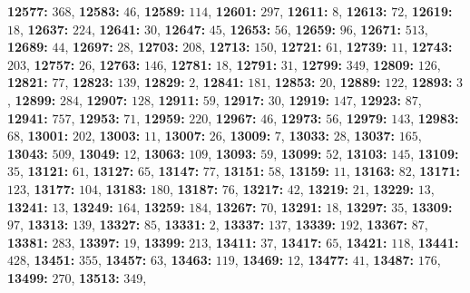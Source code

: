 \textsf{\bfseries 12577:} $368$, \textsf{\bfseries 12583:} $46$, \textsf{\bfseries 12589:} $114$, \textsf{\bfseries 12601:} $297$, \textsf{\bfseries 12611:} $8$, \textsf{\bfseries 12613:} $72$, \textsf{\bfseries 12619:} $18$, \textsf{\bfseries 12637:} $224$, \textsf{\bfseries 12641:} $30$, \textsf{\bfseries 12647:} $45$, \textsf{\bfseries 12653:} $56$, \textsf{\bfseries 12659:} $96$, \textsf{\bfseries 12671:} $513$, \textsf{\bfseries 12689:} $44$, \textsf{\bfseries 12697:} $28$, \textsf{\bfseries 12703:} $208$, \textsf{\bfseries 12713:} $150$, \textsf{\bfseries 12721:} $61$, \textsf{\bfseries 12739:} $11$, \textsf{\bfseries 12743:} $203$, \textsf{\bfseries 12757:} $26$, \textsf{\bfseries 12763:} $146$, \textsf{\bfseries 12781:} $18$, \textsf{\bfseries 12791:} $31$, \textsf{\bfseries 12799:} $349$, \textsf{\bfseries 12809:} $126$, \textsf{\bfseries 12821:} $77$, \textsf{\bfseries 12823:} $139$, \textsf{\bfseries 12829:} $2$, \textsf{\bfseries 12841:} $181$, \textsf{\bfseries 12853:} $20$, \textsf{\bfseries 12889:} $122$, \textsf{\bfseries 12893:} $3$, \textsf{\bfseries 12899:} $284$, \textsf{\bfseries 12907:} $128$, \textsf{\bfseries 12911:} $59$, \textsf{\bfseries 12917:} $30$, \textsf{\bfseries 12919:} $147$, \textsf{\bfseries 12923:} $87$, \textsf{\bfseries 12941:} $757$, \textsf{\bfseries 12953:} $71$, \textsf{\bfseries 12959:} $220$, \textsf{\bfseries 12967:} $46$, \textsf{\bfseries 12973:} $56$, \textsf{\bfseries 12979:} $143$, \textsf{\bfseries 12983:} $68$, \textsf{\bfseries 13001:} $202$, \textsf{\bfseries 13003:} $11$, \textsf{\bfseries 13007:} $26$, \textsf{\bfseries 13009:} $7$, \textsf{\bfseries 13033:} $28$, \textsf{\bfseries 13037:} $165$, \textsf{\bfseries 13043:} $509$, \textsf{\bfseries 13049:} $12$, \textsf{\bfseries 13063:} $109$, \textsf{\bfseries 13093:} $59$, \textsf{\bfseries 13099:} $52$, \textsf{\bfseries 13103:} $145$, \textsf{\bfseries 13109:} $35$, \textsf{\bfseries 13121:} $61$, \textsf{\bfseries 13127:} $65$, \textsf{\bfseries 13147:} $77$, \textsf{\bfseries 13151:} $58$, \textsf{\bfseries 13159:} $11$, \textsf{\bfseries 13163:} $82$, \textsf{\bfseries 13171:} $123$, \textsf{\bfseries 13177:} $104$, \textsf{\bfseries 13183:} $180$, \textsf{\bfseries 13187:} $76$, \textsf{\bfseries 13217:} $42$, \textsf{\bfseries 13219:} $21$, \textsf{\bfseries 13229:} $13$, \textsf{\bfseries 13241:} $13$, \textsf{\bfseries 13249:} $164$, \textsf{\bfseries 13259:} $184$, \textsf{\bfseries 13267:} $70$, \textsf{\bfseries 13291:} $18$, \textsf{\bfseries 13297:} $35$, \textsf{\bfseries 13309:} $97$, \textsf{\bfseries 13313:} $139$, \textsf{\bfseries 13327:} $85$, \textsf{\bfseries 13331:} $2$, \textsf{\bfseries 13337:} $137$, \textsf{\bfseries 13339:} $192$, \textsf{\bfseries 13367:} $87$, \textsf{\bfseries 13381:} $283$, \textsf{\bfseries 13397:} $19$, \textsf{\bfseries 13399:} $213$, \textsf{\bfseries 13411:} $37$, \textsf{\bfseries 13417:} $65$, \textsf{\bfseries 13421:} $118$, \textsf{\bfseries 13441:} $428$, \textsf{\bfseries 13451:} $355$, \textsf{\bfseries 13457:} $63$, \textsf{\bfseries 13463:} $119$, \textsf{\bfseries 13469:} $12$, \textsf{\bfseries 13477:} $41$, \textsf{\bfseries 13487:} $176$, \textsf{\bfseries 13499:} $270$, \textsf{\bfseries 13513:} $349$, 
